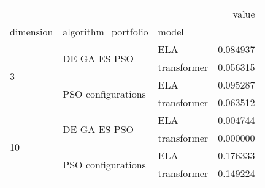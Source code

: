 \begin{tabular}{lllr}
\toprule
 &  &  & value \\
dimension & algorithm_portfolio & model &  \\
\midrule
\multirow[t]{4}{*}{3} & \multirow[t]{2}{*}{DE-GA-ES-PSO} & ELA & 0.084937 \\
 &  & transformer & 0.056315 \\
\cline{2-4}
 & \multirow[t]{2}{*}{PSO configurations} & ELA & 0.095287 \\
 &  & transformer & 0.063512 \\
\cline{1-4} \cline{2-4}
\multirow[t]{4}{*}{10} & \multirow[t]{2}{*}{DE-GA-ES-PSO} & ELA & 0.004744 \\
 &  & transformer & 0.000000 \\
\cline{2-4}
 & \multirow[t]{2}{*}{PSO configurations} & ELA & 0.176333 \\
 &  & transformer & 0.149224 \\
\cline{1-4} \cline{2-4}
\bottomrule
\end{tabular}
